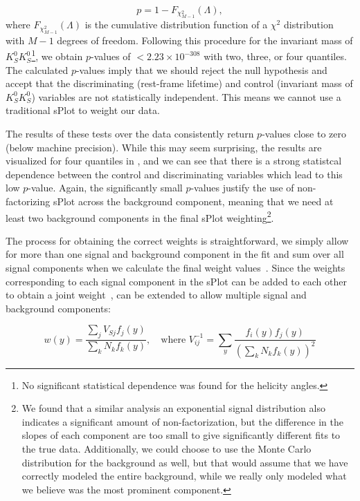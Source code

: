 \begin{equation}
  p = 1 - F_{\chi^2_{M-1}}(\Lambda),
  \label{eq:significance-test}
\end{equation}
where $F_{\chi^2_{M-1}}(\Lambda)$ is the cumulative distribution function of a $\chi^2$ distribution with $M-1$ degrees of freedom. Following this procedure for the invariant mass of $K_S^0K_S^0$\footnote{No significant statistical dependence was found for the helicity angles.}, we obtain $p$-values of $<2.23\times10^{-308}$ with two, three, or four quantiles. The calculated $p$-values imply that we should reject the null hypothesis and accept that the discriminating (rest-frame lifetime) and control (invariant mass of $K_S^0K_S^0$) variables are not statistically independent. This means we cannot use a traditional sPlot to weight our data.

The results of these tests over the data consistently return $p$-values close to zero (below machine precision). While this may seem surprising, the results are visualized for four quantiles in , and we can see that there is a strong statistcal dependence between the control and discriminating variables which lead to this low $p$-value. Again, the significantly small $p$-values justify the use of non-factorizing sPlot across the background component, meaning that we need at least two background components in the final sPlot weighting\footnote{We found that a similar analysis an exponential signal distribution also indicates a significant amount of non-factorization, but the difference in the slopes of each component are too small to give significantly different fits to the true data. Additionally, we could choose to use the Monte Carlo distribution for the background as well, but that would assume that we have correctly modeled the entire background, while we really only modeled what we believe was the most prominent component.}.

The process for obtaining the correct weights is straightforward, we simply allow for more than one signal and background component in the fit and sum over all signal components when we calculate the final weight values~\cite{Dembinski2022}. Since the weights corresponding to each signal component in the sPlot can be added to each other to obtain a joint weight~\cite{Pivk2005},  can be extended to allow multiple signal and background components:

\begin{equation}
  w(y) = \frac{\sum_{j} V_{Sj}f_j(y)}{\sum_{k}N_kf_k(y)},\quad \text{where } V_{ij}^{-1} = \sum_{y} \frac{f_i(y)f_j(y)}{\left(\sum_{k} N_kf_k(y)\right)^2}
  \label{eq:splot-weights-factorizing}
\end{equation}

